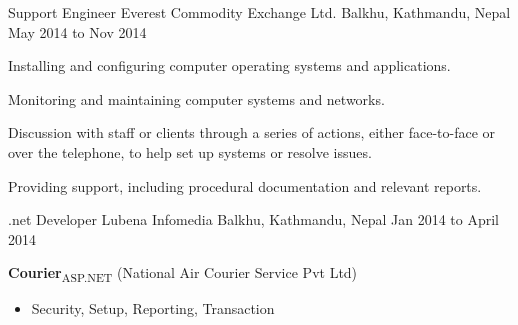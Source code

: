 \begin{cventries}
  \cventry
    {Support Engineer} %
    {Everest Commodity Exchange Ltd.} %
    {Balkhu, Kathmandu, Nepal} %
    {May 2014 to Nov 2014} %
    {
      \begin{cvitems} %
        \item {Installing and configuring computer operating systems and applications.}
        \item {Monitoring and maintaining computer systems and networks.}
        \item{Discussion with staff or clients through a series of actions, either face-to-face or over the telephone, to help set up systems or resolve issues.}
		\item{Providing support, including procedural documentation and relevant reports.}
      \end{cvitems} 
    }

  \cventry
    {.net Developer} %
    {Lubena Infomedia} %
    {Balkhu, Kathmandu, Nepal} %
    {Jan 2014 to April 2014} %
    {
      \begin{cvitems} %
        \item {\textbf{Courier}\textsubscript{ASP.NET} (National Air Courier Service Pvt Ltd)}
        \begin{itemize}
        \item {Security, Setup, Reporting, Transaction}
        \end{itemize}      
      \end{cvitems}
    }


\end{cventries}
